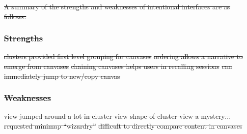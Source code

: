 \documentclass[12pt,fleqn]{ucithesis}
\providecommand{\DIFdeltex}[1]{{\protect\color{red}\sout{#1}}}                      %
\providecommand{\DIFdelbegin}{} %
\providecommand{\DIFdel}[1]{\texorpdfstring{\DIFdeltex{#1}}{}} %
\begin{document}
\DIFdelbegin %

\DIFdel{A summary of the strengths and weaknesses of intentional interfaces are as follows:
}%

\subsubsection{\DIFdel{Strengths}}
\addtocounter{subsubsection}{-1}%

\DIFdel{clusters provided first level grouping for canvases
	}%
\DIFdel{ordering allows a narrative to emerge from canvases
	}%
\DIFdel{chaining canvases helps users in recalling sessions
	}%
\DIFdel{can immediately jump to new/copy canvas
}%

\subsubsection{\DIFdel{Weaknesses}}
\addtocounter{subsubsection}{-1}%

\DIFdel{view jumped around a lot in cluster view
	}%
\DIFdel{shape of cluster view a mystery... requested minimap ``wizardry''
	}%
\DIFdel{difficult to directly compare content in canvases
}%
\end{document}
